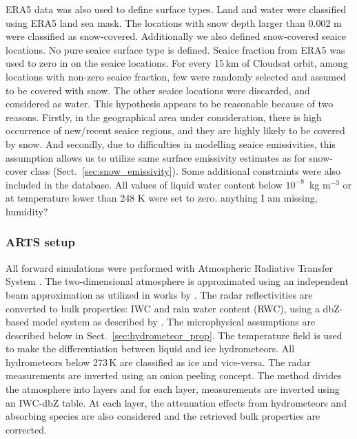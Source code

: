 \documentclass[amt, manuscript]{copernicus}
\newcommand{\todo}[1]{{\color{red} #1}}
\begin{document}
ERA5 data was also used to define surface types. Land and water were classified using ERA5 land sea mask. The locations with snow depth larger than 0.002\,\,m were classified as snow-covered. Additionally we also defined snow-covered seaice locations. No pure seaice surface type is defined. Seaice fraction from ERA5 was used to zero in on the seaice locations. For every 15\,km of Cloudsat orbit, among locations with non-zero seaice fraction, few were randomly selected and assumed to be covered with snow. The other seaice locations were discarded, and considered as water. This hypothesis appears to be reasonable because of two reasons. Firstly, in the geographical area under consideration, there is high occurrence of new/recent seaice regions, and they are highly likely to be covered by snow. And secondly, due to difficulties in modelling seaice emissivities, this assumption allows us to utilize same surface emissivity estimates as for snow-cover class  (Sect.~\ref{sec:snow_emissivity}).  Some additional constraints were also included in the database. All values of liquid water content below $10^{-8}$ \,kg m$^{-3}$ or at temperature lower than 248\,\,K were set to zero. \todo{anything I am missing, humidity?}








\subsubsection{ARTS setup}
%
\label{sec:arts_setup}

All forward simulations were performed with Atmospheric Radiative Transfer System \citep{eriksson:arts2:11}. The two-dimensional atmosphere is approximated using an independent beam approximation as utilized in works by \citet{ekelund2020using, eriksson:towar:20}. 
The radar reflectivities are converted to bulk properties: IWC and rain water content (RWC), using a dbZ-based model system as described by \citet{ekelund2020using}. The microphysical assumptions are described below in Sect.~\ref{sec:hydrometeor_prop}. The temperature field is used to make the differentiation between liquid and ice hydrometeors. All hydrometeors below 273\,K are classified as ice and vice-versa. The radar measurements are inverted using an onion peeling concept. The method  divides the atmosphere into layers and for each layer, measurements are inverted using an IWC-dbZ table. At each layer, the attenuation effects from hydrometeors and absorbing species are also considered and the retrieved bulk properties are corrected. 
\end{document}
